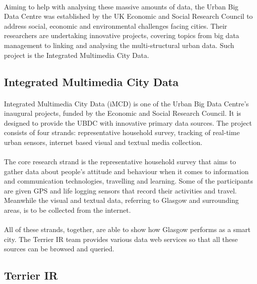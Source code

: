 \documentclass{l4proj}
\begin{document}
\paragraph{}
Aiming to help with analysing these massive amounts of data, the Urban Big Data Centre was established by the UK Economic and Social Research Council to address social, economic and environmental challenges facing cities. Their researchers are undertaking innovative projects, covering topics from big data management to linking and analysing the multi-structural urban data.  Such project is the Integrated Multimedia City Data. 



\subsection{Integrated Multimedia City Data}

\paragraph{}
Integrated Multimedia City Data\cite{imcd} (iMCD) is one of the Urban Big Data Centre’s inaugural projects, funded by the Economic and Social Research Council. It is designed to provide the UBDC with innovative primary data sources. The project consists of four strands: representative household survey, tracking of real-time urban sensors, internet based visual and textual media collection.  
\paragraph{}
The core research strand is the representative household survey that aims to gather data about people’s attitude and behaviour when it comes to information and communication technologies, travelling and learning. Some of the participants are given GPS and life logging sensors that record their activities and travel. Meanwhile the visual and textual data, referring to Glasgow and surrounding areas, is to be collected from the internet. 
\paragraph{}
All of these strands, together, are able to show how Glasgow performs as a smart city.  The Terrier IR team provides various data web services so that all these sources can be browsed and queried.

\subsection{Terrier IR}
\end{document}
